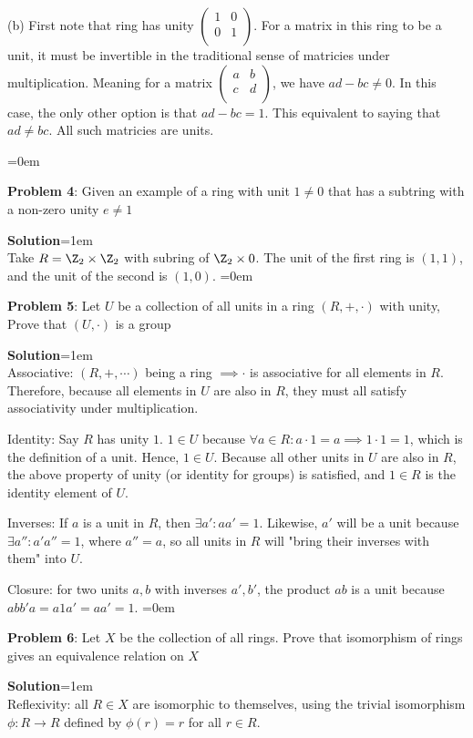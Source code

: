 \documentclass{article}
\begin{document}
(b) First note that ring has unity $\begin{pmatrix}
    1 & 0 \\
    0 & 1\\
\end{pmatrix}$. For a matrix in this ring to be a unit, it must be invertible in the traditional sense of matricies under multiplication. Meaning for a matrix $\begin{pmatrix}
    a & b \\
    c & d\\
\end{pmatrix}$, we have $ad - bc \neq 0$. In this case, the only other option is that $ad - bc = 1$. This equivalent to saying that $ad \neq bc$. All such matricies are units. 

\newpage\parskip=0em
\begin{mdframed}[backgroundcolor=blue!20]
\textbf{Problem 4}: Given an example of a ring with unit $1 \neq 0$ that has a subtring with a non-zero unity $e \neq 1$
\end{mdframed}
\textbf{Solution}\parskip=1em\\
Take $R = \Z_2 \times \Z_2$ with subring of $\Z_2 \times {0}$. The unit of the first ring is $(1, 1)$, and the unit of the second is $(1, 0)$.
\newpage\parskip=0em
\begin{mdframed}[backgroundcolor=blue!20]
\textbf{Problem 5}: Let $U$ be a collection of all units in a ring $(R, + ,\cdot)$ with unity, Prove that $(U, \cdot)$ is a group
\end{mdframed}
\textbf{Solution}\parskip=1em\\
Associative: $(R, +, \cdots)$ being a ring $\implies \cdot$ is associative for all elements in $R$. Therefore, because all elements in $U$ are also in $R$, they must all satisfy associativity under multiplication.

Identity: Say $R$ has unity $1$. $1 \in U$ because $\forall a\in R: a\cdot 1 = a \implies 1 \cdot 1 = 1$, which is the definition of a unit. Hence, $1 \in U$. Because all other units in $U$ are also in $R$, the above property of unity (or identity for groups) is satisfied, and $1 \in R$ is the identity element of $U$. 

Inverses: If $a$ is a unit in $R$, then $\exists a': aa' = 1$. Likewise, $a'$ will be a unit because $\exists a'': a'a'' = 1$, where $a'' = a$, so all units in $R$ will "bring their inverses with them" into $U$.

Closure: for two units $a, b$ with inverses $a', b'$, the product $ab$ is a unit because $abb'a = a1a' = aa' = 1$.
\newpage\parskip=0em
\begin{mdframed}[backgroundcolor=blue!20]
\textbf{Problem 6}: Let $X$ be the collection of all rings. Prove that isomorphism of rings gives an equivalence relation on $X$
\end{mdframed}
\textbf{Solution}\parskip=1em\\
Reflexivity: all $R \in X$ are isomorphic to themselves, using the trivial isomorphism $\phi: R\to R$ defined by $\phi(r) = r$ for all $r\in R$.
\end{document}
